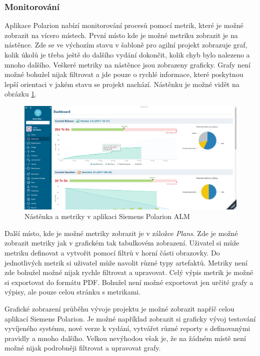 \documentclass[czech,master,public,dept460,male,cpdeclaration,oneside]{diploma}
\begin{document}
\subsubsection{Monitorování}
Aplikace Polarion nabízí monitorování procesů pomocí metrik, které je možné zobrazit na vícero místech. První místo kde je možné metriku zobrazit je na nástěnce. Zde se ve výchozím stavu v šabloně pro agilní projekt zobrazuje graf, kolik úkolů je třeba ještě do dalšího vydání dokončit, kolik chyb bylo nalezeno a mnoho dalšího. Veškeré metriky na nástěnce jsou zobrazeny graficky. Grafy není možné bohužel nijak filtrovat a jde pouze o rychlé informace, které poskytnou lepší orientaci v jakém stavu se projekt nachází. Nástěnku je možné vidět na obrázku \ref{fig:polarion_dashboard}.

\begin{figure}[!ht]
    \centering
    \includegraphics[width=1\textwidth]{Diplomka/Figures/polarion_dashboard.png}
    \caption{Nástěnka a metriky v aplikaci Siemens Polarion ALM}
    \label{fig:polarion_dashboard}
\end{figure}

Další místo, kde je možné metriky zobrazit je v záložce \textit{Plans}. Zde je možné zobrazit metriky jak v grafickém tak tabulkovém zobrazení. Uživatel si může metriku definovat a vytvořit pomocí filtrů v horní části obrazovky. Do jednotlivých metrik si uživatel může navolit různé typy artefaktů. Metriky není zde bohužel možné nijak rychle filtrovat a upravovat. Celý výpis metrik je možné si exportovat do formátu PDF. Bohužel není možné exportovat jen určité grafy a výpisy, ale pouze celou stránku s metrikami.

Grafické zobrazení průběhu vývoje projektu je možné zobrazit napříč celou aplikací Siemens Polarion. Je možné například zobrazit si graficky vývoj testování vyvíjeného systému, nové verze k vydání, vytvářet různé reporty s definovanými pravidly a mnoho dalšího. Velkou nevýhodou však je, že na žádném místě není možné nijak podrobněji filtrovat a upravovat grafy.
\end{document}
